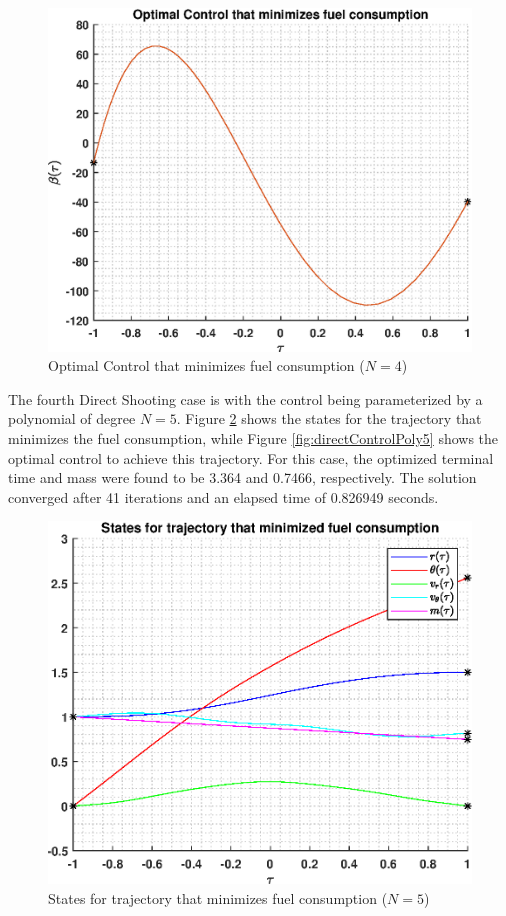 \documentclass[]{article}
\begin{document}
\begin{figure}
	\centering
	\includegraphics[scale=0.75]{directControlPoly4.eps}
	\caption{Optimal Control that minimizes fuel consumption (\(N = 4\))}
	\label{fig:directControlPoly4}
\end{figure}
\vspace{2mm}\newline 
The fourth Direct Shooting case is with the control being parameterized by a polynomial of degree \(N = 5\). Figure \ref{fig:directStatesPoly5} shows the states for the trajectory that minimizes the fuel consumption, while Figure \ref{fig:directControlPoly5} shows the optimal control to achieve this trajectory. For this case, the optimized terminal time and mass were found to be 3.364 and 0.7466, respectively. The solution converged after 41 iterations and an elapsed time of 0.826949 seconds.
\begin{figure}
	\centering
	\includegraphics[scale=0.75]{directStatesPoly5.eps}
	\caption{States for trajectory that minimizes fuel consumption (\(N = 5\))}
	\label{fig:directStatesPoly5}
\end{figure}
\end{document}
